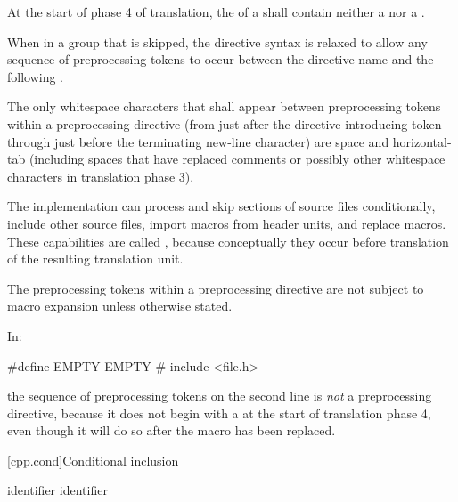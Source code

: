 \documentclass{wg21}
\newcommand{\clb}[1]{\removed{#1} \added{\grammarterm{line-break}}}
\begin{document}
\pnum
At the start of phase 4 of translation,
the  of a  shall
contain neither a  nor a .

\pnum
When in a group that is skipped, the directive
syntax is relaxed to allow any sequence of preprocessing tokens to occur between
the directive name and the following \clb{new-line character}.

\pnum
\begin{removedblock}
The only whitespace characters that shall appear
between preprocessing tokens
within a preprocessing directive
(from just after the directive-introducing token
through just before the terminating new-line character)
are space and horizontal-tab
(including spaces that have replaced comments
or possibly other whitespace characters
in translation phase 3).
\end{removedblock}

\pnum
The implementation can
process and skip sections of source files conditionally,
include other source files,
import macros from header units,
and replace macros.
These capabilities are called
,
because conceptually they occur
before translation of the resulting translation unit.

\pnum
The preprocessing tokens within a preprocessing directive
are not subject to macro expansion unless otherwise stated.

\begin{example}
    In:
    \begin{codeblock}
        #define EMPTY
        EMPTY   #   include <file.h>
    \end{codeblock}
    the sequence of preprocessing tokens on the second line is \textit{not}
    a preprocessing directive, because it does not begin with a \tcode{\#} at the start of
    translation phase 4, even though it will do so after the macro 
    has been replaced.
\end{example}

[cpp.cond]{Conditional inclusion}%
%

%
\begin{bnf}
    \br
     identifier\br
     identifier \terminal{)}
\end{bnf}
\end{document}
